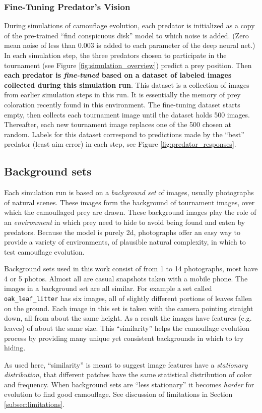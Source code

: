 \documentclass[acmtog]{acmart}
\newcommand{\jargon}[1]{\textit{#1}}
\begin{document}
\subsubsection{Fine-Tuning Predator's Vision}
During simulations of camouflage evolution, each predator is initialized as a copy of the pre-trained “find conspicuous disk” model to which noise is added. (Zero mean noise of less than 0.003 is added to each parameter of the deep neural net.) In each simulation step, the three predators chosen to participate in the tournament (see Figure \ref{fig:simulation_overview}) predict a prey position. Then \textbf{each predator is \jargon{fine-tuned} based on a dataset of labeled images collected during this simulation run}. This dataset is a collection of images from earlier simulation steps in this run. It is essentially the memory of prey coloration recently found in this environment. The fine-tuning dataset starts empty, then collects each tournament image until the dataset holds 500 images. Thereafter, each new tournament image replaces one of the 500 chosen at random. Labels for this dataset correspond to predictions made by the “best” predator (least aim error) in each step, see Figure \ref{fig:predator_responses}.
\par


\subsection{Background sets}
\label{subsec:background_sets}
Each simulation run is based on a \jargon{background set} of images, usually photographs of natural scenes. These images form the background of tournament images, over which the camouflaged prey are drawn. These background images play the role of an \jargon{environment} in which prey need to hide to avoid being found and eaten by predators. Because the model is purely 2d, photographs offer an easy way to provide a variety of environments, of plausible natural complexity, in which to test camouflage evolution.
\par
Background sets used in this work consist of from 1 to 14 photographs, most have 4 or 5 photos. Almost all are casual snapshots taken with a mobile phone. The images in a background set are all similar. For example a set called \texttt{oak\_leaf\_litter} has six images, all of slightly different portions of leaves fallen on the ground. Each image in this set is taken with the camera pointing straight down, all from about the same height. As a result the images have features (e.g. leaves) of about the same size. This “similarity” helps the camouflage evolution process by providing many unique yet consistent backgrounds in which to try hiding.
\par
As used here, “similarity” is meant to suggest image features have a \jargon{stationary distribution}, that different patches have the same statistical distribution of color and frequency. When background sets are “less stationary” it becomes \jargon{harder} for evolution to find good camouflage. See discussion of limitations in Section \ref{subsec:limitations}.
\end{document}
